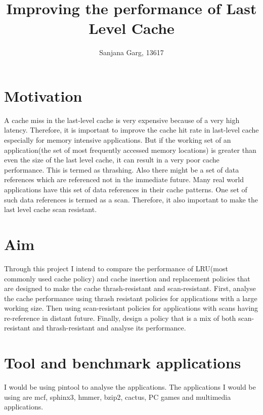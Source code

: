 \documentclass{article}
\title{Improving the performance of Last Level Cache}
\author{Sanjana Garg, 13617}
\date{}
\begin{document}
\maketitle
\section*{Motivation}
A cache miss in the last-level cache is very expensive because of a very high latency. Therefore, it is important to improve the cache hit rate in last-level cache especially for memory intensive applications. But if the working set of an application(the set of most frequently accessed memory locations) is greater than even the size of the last level cache, it can result in a very poor cache performance. This is termed as thrashing. Also there might be a set of data references which are referenced not in the immediate future. Many real world applications have  this set of data references in their cache patterns. One set of such data references is termed as a scan. Therefore, it also important to make the last level cache scan resistant.

\section*{Aim}
Through this project I intend to compare the performance of LRU(most commonly used cache policy) and cache insertion and replacement policies that are  designed to make the cache thrash-resistant and scan-resistant. First, analyse the cache performance using thrash resistant policies for applications with a large working size. Then using  scan-resistant policies for applications with scans having re-reference in distant future. Finally, design a policy that is a mix of both scan-resistant and thrash-resistant and analyse its performance.

\section*{Tool and benchmark applications}
I would be using pintool to analyse the applications. The applications I would be using are mcf, sphinx3, hmmer, bzip2, cactus, PC games and multimedia applications.
\end{document}
